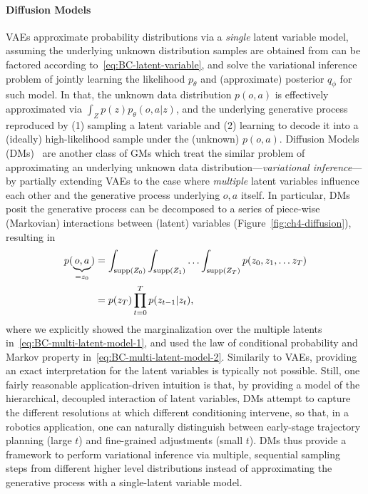 \paragraph{Diffusion Models}
VAEs approximate probability distributions via a \emph{single} latent variable model, assuming the underlying unknown distribution samples are obtained from can be factored according to~\ref{eq:BC-latent-variable}, and solve the variational inference problem of jointly learning the likelihood \( p_\theta \) and (approximate) posterior \( q_\phi \) for such model.
In that, the unknown data distribution \( p(o,a) \) is effectively approximated via \( \int_Z p(z) p_\theta(o,a \vert z) \), and the underlying generative process reproduced by (1) sampling a latent variable and (2) learning to decode it into a (ideally) high-likelihood sample under the (unknown) \( p(o,a) \).
Diffusion Models (DMs)~\citep{hoDenoisingDiffusionProbabilistic2020} are another class of GMs which treat the similar problem of approximating an underlying unknown data distribution---\emph{variational inference}---by partially extending VAEs to the case where \emph{multiple} latent variables influence each other and the generative process underlying \(o,a\) itself.
In particular, DMs posit the generative process can be decomposed to a series of piece-wise (Markovian) interactions between (latent) variables (Figure~\ref{fig:ch4-diffusion}), resulting in
\begin{align}
    p(\underbrace{o,a}_{= z_0}) &= \int_{\text{supp}({Z_0})} \int_{\text{supp}({Z_1})} \hdots \int_{\text{supp}({Z_T})} p(z_0, z_1, \dots z_T) \label{eq:BC-multi-latent-model-1} \\ 
    &= p(z_T) \prod_{t=0}^{T} p(z_{t-1} \vert z_t), \label{eq:BC-multi-latent-model-2}
\end{align}
where we explicitly showed the marginalization over the multiple latents in~\ref{eq:BC-multi-latent-model-1}, and used the law of conditional probability and Markov property in~\ref{eq:BC-multi-latent-model-2}.
Similarily to VAEs, providing an exact interpretation for the latent variables is typically not possible.
Still, one fairly reasonable application-driven intuition is that, by providing a model of the hierarchical, decoupled interaction of latent variables, DMs attempt to capture the different resolutions at which different conditioning intervene, so that, in a robotics application, one can naturally distinguish between early-stage trajectory planning (large \( t \)) and fine-grained adjustments (small \( t \)).
DMs thus provide a framework to perform variational inference via multiple, sequential sampling steps from different higher level distributions instead of approximating the generative process with a single-latent variable model.


